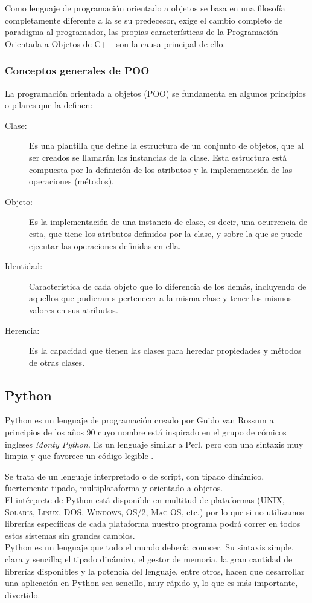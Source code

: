 \documentclass[12pt]{book} %
\begin{document}
		 	Como lenguaje de programación orientado a objetos  se basa en una filosofía completamente diferente a la se su predecesor, exige 
		 	el cambio completo de paradigma al programador, las propias características de la Programación Orientada a Objetos de C++ son 
		 	la causa principal de ello.
		 \subsubsection{Conceptos generales de POO}
		 	La programación orientada a objetos (POO) se fundamenta en algunos principios o pilares que la definen:
		 	\begin{description}
		 		\item[Clase:] Es una plantilla que define la estructura de un conjunto de objetos, que al ser creados se llamarán las
			 		instancias de la clase. Esta estructura está compuesta por la definición de los atributos y la implementación de las
			 		operaciones (métodos).
		 		\item[Objeto:] Es la implementación de una instancia de clase, es decir, una ocurrencia de esta, que tiene los atributos
		 			definidos por la clase, y sobre la que se puede ejecutar las operaciones definidas en ella. 
		 		\item[Identidad:] Característica de cada objeto que lo diferencia de los demás, incluyendo de aquellos que pudieran
		 			s pertenecer a la misma clase y tener los mismos valores en sus atributos. 
		 		\item[Herencia:] Es la capacidad que tienen las clases para heredar propiedades y métodos de otras clases. 
		 	\end{description}
		
		
	\subsection{Python \label{python}}
		Python es un lenguaje de programación creado por Guido van Rossum a principios de los años 90 cuyo nombre está inspirado en el grupo
		de cómicos ingleses \textit{Monty Python}. Es un lenguaje similar a Perl, pero con una sintaxis muy limpia y que favorece un código 
		legible \cite{python}.
		
		Se trata de un lenguaje interpretado o de script, con tipado dinámico, fuertemente tipado, multiplataforma y orientado a objetos.\\
		
		El intérprete de Python está disponible en multitud de plataformas (\textsc{UNIX, Solaris, Linux, DOS, Windows, OS/2, Mac OS}, etc.)
		por lo que si no utilizamos librerías específicas de cada plataforma nuestro programa podrá correr en todos estos sistemas sin
		grandes cambios.\\
		Python es un lenguaje que todo el mundo debería conocer. Su sintaxis simple, clara y sencilla; el tipado dinámico, el gestor de
		memoria, la gran cantidad de librerías disponibles y la potencia del lenguaje, entre otros, hacen que desarrollar una aplicación en
		Python sea sencillo, muy rápido y, lo que es más importante, divertido.\\		
		
\end{document}
